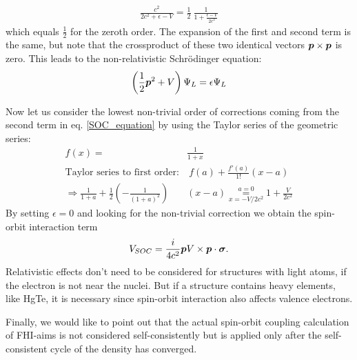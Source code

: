 	\begin{align}
		\frac{c^2}{2c^2 + \epsilon -V} = 
		\frac{1}{2}~ \frac{1}{1 + \frac{\epsilon-V}{2c^2}} 
	\end{align}
	which equals $\frac{1}{2}$ for the zeroth order. The expansion of the first and second term is the same, but note that the crossproduct of these two identical vectors $\boldsymbol{p} \times \boldsymbol{p}$ is zero.
	This leads to the non-relativistic Schrödinger equation:
	\begin{align}
		\left(
		\frac{1}{2} \boldsymbol{p}^2 + V 
		\right)\Psi_L
		= \epsilon \Psi_L
	\end{align}

	Now let us consider the lowest non-trivial order of corrections coming from the second term in eq. \eqref{SOC_equation} by using the Taylor series of the geometric series:
	\begin{align}
		f(x)=& \frac{1}{1+x} \\
		\text{Taylor series to first order:}& ~f(a) + \frac{f'(a)}{1!} (x-a)  \\
		\Rightarrow
		\frac{1}{1+a} + \frac{1}{2}
		\left(
			- \frac{1}{(1+a)^2}	
		\right)&
		(x - a) 
		\overset{a=0}{\underset{x=-V/2c^2}{=}}		
		1 + \frac{V}{2c^2}
	\end{align} 
	By setting $\epsilon=0$ and looking for the non-trivial correction we obtain the spin-orbit interaction term  
	\begin{align}
		V_{SOC} = \frac{i}{4c^2} \boldsymbol{p} V \times \boldsymbol{p} \cdot \boldsymbol{\sigma}.
	\end{align}
	Relativistic effects don't need to be considered for structures with light atoms, if the electron is not near the nuclei. But if a structure contains heavy elements, like HgTe, it is necessary since spin-orbit interaction also affects valence electrons.

	Finally, we would like to point out that the actual spin-orbit coupling calculation of FHI-aims 
	is not considered self-consistently but is applied only after the self-consistent cycle of the density has converged.

